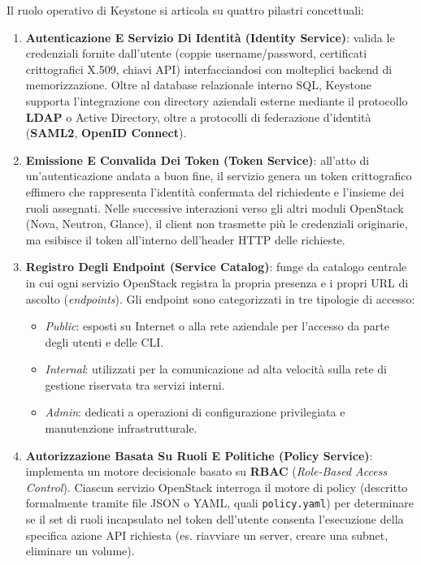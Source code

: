 \documentclass[11pt, a4paper]{article}
\begin{document}
Il ruolo operativo di Keystone si articola su quattro pilastri concettuali:
\begin{enumerate}
    \item \textbf{Autenticazione E Servizio Di Identità (Identity Service)}: valida le credenziali fornite dall'utente (coppie username/password, certificati crittografici X.509, chiavi API) interfacciandosi con molteplici backend di memorizzazione. Oltre al database relazionale interno SQL, Keystone supporta l'integrazione con directory aziendali esterne mediante il protocollo \textbf{LDAP} o Active Directory, oltre a protocolli di federazione d'identità (\textbf{SAML2}, \textbf{OpenID Connect}).
    \item \textbf{Emissione E Convalida Dei Token (Token Service)}: all'atto di un'autenticazione andata a buon fine, il servizio genera un token crittografico effimero che rappresenta l'identità confermata del richiedente e l'insieme dei ruoli assegnati. Nelle successive interazioni verso gli altri moduli OpenStack (Nova, Neutron, Glance), il client non trasmette più le credenziali originarie, ma esibisce il token all'interno dell'header HTTP delle richieste.
    \item \textbf{Registro Degli Endpoint (Service Catalog)}: funge da catalogo centrale in cui ogni servizio OpenStack registra la propria presenza e i propri URL di ascolto (\emph{endpoints}). Gli endpoint sono categorizzati in tre tipologie di accesso:
    \begin{itemize}[noitemsep]
        \item \emph{Public}: esposti su Internet o alla rete aziendale per l'accesso da parte degli utenti e delle CLI.
        \item \emph{Internal}: utilizzati per la comunicazione ad alta velocità sulla rete di gestione riservata tra servizi interni.
        \item \emph{Admin}: dedicati a operazioni di configurazione privilegiata e manutenzione infrastrutturale.
    \end{itemize}
    \item \textbf{Autorizzazione Basata Su Ruoli E Politiche (Policy Service)}: implementa un motore decisionale basato su \textbf{RBAC} (\emph{Role-Based Access Control}). Ciascun servizio OpenStack interroga il motore di policy (descritto formalmente tramite file JSON o YAML, quali \texttt{policy.yaml}) per determinare se il set di ruoli incapsulato nel token dell'utente consenta l'esecuzione della specifica azione API richiesta (es. riavviare un server, creare una subnet, eliminare un volume).
\end{enumerate}
\end{document}
